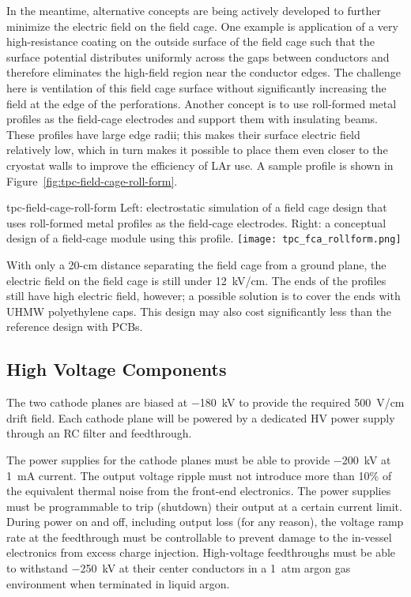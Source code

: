 In the meantime, alternative concepts are being actively developed to
further minimize the electric field on the field cage.  One example is
application of a very high-resistance coating on the outside surface
of the field cage such that the surface potential distributes
uniformly across the gaps between conductors and therefore eliminates
the high-field region near the conductor edges.  The challenge here is
ventilation of this field cage surface without significantly
increasing the field at the edge of the perforations.  Another concept
is to use roll-formed metal profiles as the field-cage electrodes and
support them with insulating beams.  These profiles have large edge
radii; this makes their surface electric field relatively low, which
in turn makes it possible to place them even closer to the cryostat
walls to improve the efficiency of LAr use.  A sample profile is shown
in Figure~\ref{fig:tpc-field-cage-roll-form}.
\begin{cdrfigure}{tpc-field-cage-roll-form}
{Left: electrostatic simulation of a field cage design that uses roll-formed 
metal profiles as the field-cage electrodes.  Right: a conceptual design of a 
field-cage module using this profile.}
\texttt{[image: tpc\_fca\_rollform.png]}
\end{cdrfigure}
With only a 20-cm distance separating the field cage from a ground
plane, the electric field on the field cage is still under 12~kV/cm.
The ends of the profiles still have high electric field, however; a
possible solution is to cover the ends with UHMW polyethylene caps.
This design may also cost significantly less than the reference design
with PCBs.


\subsection{High Voltage Components}  
\label{subsec:fd-ref-hv}
   
The two cathode planes are biased at $-$180~kV to provide the required
500~V/cm drift field. Each cathode plane will be powered by a
dedicated HV power supply through an RC filter and feedthrough.

The power supplies for the cathode planes must be able to provide
$-$200~kV at 1~mA current. The output voltage ripple must not
introduce more than 10\% of the equivalent thermal noise from the
front-end electronics.  The power supplies must be programmable to
trip (shutdown) their output at a certain current limit.  During power
on and off, including output loss (for any reason), the voltage ramp
rate at the feedthrough must be controllable to prevent damage to the
in-vessel electronics from excess charge injection.  High-voltage
feedthroughs must be able to withstand $-$250~kV at their center
conductors in a 1~atm argon gas environment when terminated in liquid
argon.


